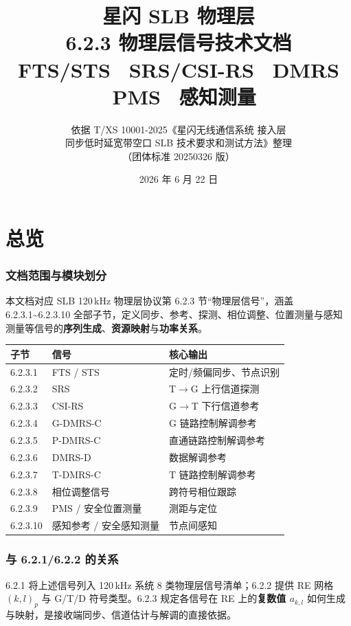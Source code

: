 \documentclass[11pt,a4paper]{ctexart}
\title{%
  \textbf{星闪 SLB 物理层}\\[0.4em]
  \Large 6.2.3 物理层信号技术文档\\[0.3em]
  \large FTS/STS \textbullet\ SRS/CSI-RS \textbullet\ DMRS \textbullet\ PMS \textbullet\ 感知测量
}
\author{依据 T/XS 10001-2025《星闪无线通信系统 接入层\\
同步低时延宽带空口 SLB 技术要求和测试方法》整理\\
（团体标准 20250326 版）}
\date{2026 年 6 月 22 日}
\begin{document}
\maketitle
\tableofcontents
\newpage

\part{总览}

\section{文档范围与模块划分}

本文档对应 SLB 120\,kHz 物理层协议第 6.2.3 节``物理层信号''，涵盖 6.2.3.1\textasciitilde 6.2.3.10 全部子节，定义同步、参考、探测、相位调整、位置测量与感知测量等信号的\textbf{序列生成}、\textbf{资源映射}与\textbf{功率关系}。

\begin{table}[h]
\centering
\small
\begin{tabular}{lll}
\toprule
\textbf{子节} & \textbf{信号} & \textbf{核心输出} \\
\midrule
6.2.3.1 & FTS / STS & 定时/频偏同步、节点识别 \\
6.2.3.2 & SRS & T$\rightarrow$G 上行信道探测 \\
6.2.3.3 & CSI-RS & G$\rightarrow$T 下行信道参考 \\
6.2.3.4 & G-DMRS-C & G 链路控制解调参考 \\
6.2.3.5 & P-DMRS-C & 直通链路控制解调参考 \\
6.2.3.6 & DMRS-D & 数据解调参考 \\
6.2.3.7 & T-DMRS-C & T 链路控制解调参考 \\
6.2.3.8 & 相位调整信号 & 跨符号相位跟踪 \\
6.2.3.9 & PMS / 安全位置测量 & 测距与定位 \\
6.2.3.10 & 感知参考 / 安全感知测量 & 节点间感知 \\
\bottomrule
\end{tabular}
\end{table}

\section{与 6.2.1/6.2.2 的关系}

6.2.1 将上述信号列入 120\,kHz 系统 8 类物理层信号清单；6.2.2 提供 RE 网格 $(k,l)_p$ 与 G/T/D 符号类型。6.2.3 规定各信号在 RE 上的\textbf{复数值 $a_{k,l}$} 如何生成与映射，是接收端同步、信道估计与解调的直接依据。
\end{document}
